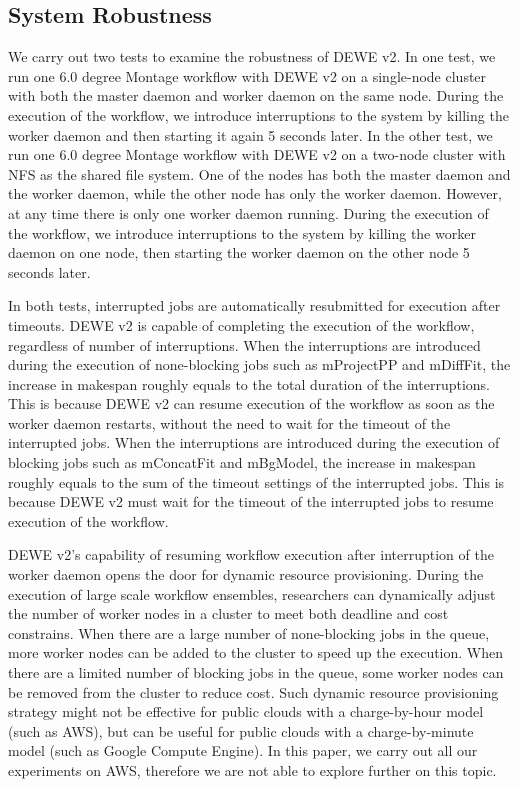 \subsection{System Robustness}
\label{sec:subsec:rubustness}

We carry out two tests to examine the robustness of DEWE v2. In one test, we run one 6.0 degree Montage workflow with DEWE v2 on a single-node cluster with both the master daemon and worker daemon on the same node. During the execution of the workflow, we introduce interruptions to the system by killing the worker daemon and then starting it again 5 seconds later. In the other test, we run one 6.0 degree Montage workflow with DEWE v2 on a two-node cluster with NFS as the shared file system. One of the nodes has both the master daemon and the worker daemon, while the other node has only the worker daemon. However, at any time there is only one worker daemon running. During the execution of the workflow, we introduce interruptions to the system by killing the worker daemon on one node, then starting the worker daemon on the other node 5 seconds later. 

In both tests, interrupted jobs are automatically resubmitted for execution after timeouts. DEWE v2 is capable of completing the execution of the workflow, regardless of number of interruptions. When the interruptions are introduced during the execution of none-blocking jobs such as mProjectPP and mDiffFit, the increase in makespan roughly equals to the total duration of the interruptions. This is because DEWE v2 can resume execution of the workflow as soon as the worker daemon restarts, without the need to wait for the timeout of the interrupted jobs. When the interruptions are introduced during the execution of blocking jobs such as mConcatFit and mBgModel, the increase in makespan roughly equals to the sum of the timeout settings of the interrupted jobs. This is because DEWE v2 must wait for the timeout of the interrupted jobs to resume execution of the workflow.

DEWE v2's capability of resuming workflow execution after interruption of the worker daemon opens the door for dynamic resource provisioning. During the execution of large scale workflow ensembles, researchers can dynamically adjust the number of worker nodes in a cluster to meet both deadline and cost constrains. When there are a large number of none-blocking jobs in the queue, more worker nodes can be added to the cluster to speed up the execution. When there are a limited number of blocking jobs in the queue, some worker nodes can be removed from the cluster to reduce cost. Such dynamic resource provisioning strategy might not be effective for public clouds with a charge-by-hour model (such as AWS), but can be useful for public clouds with a charge-by-minute model (such as Google Compute Engine). In this paper, we carry out all our experiments on AWS, therefore we are not able to explore further on this topic.



